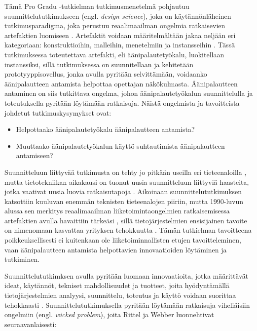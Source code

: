 \documentclass[utf8]{gradu3}
\begin{document}
Tämä Pro Gradu -tutkielman tutkimusmenetelmä pohjautuu suunnittelututkimukseen (engl. \textit{design science}), joka on käytännönläheinen tutkimusparadigma, joka perustuu reaalimaailman ongelmia ratkaisevien artefaktien luomiseen \parencite[][]{hevner2004}. Artefaktit voidaan määritelmältään jakaa neljään eri kategoriaan: konstruktioihin, malleihin, menetelmiin ja instansseihin \parencite[][]{hevner2004}. Tässä tutkimuksessa toteutettava artefakti, eli äänipalautetyökalu, luokitellaan instanssiksi, sillä tutkimuksessa on suunnitellaan ja kehitetään prototyyppisovellus, jonka avulla pyritään selvittämään, voidaanko äänipalautteen antamista helpottaa opettajan näkökulmasta. Äänipalautteen antaminen on siis tutkittava ongelma, johon äänipalautetyökalun suunnittelulla ja toteutuksella pyritään löytämään ratkaisuja. Näistä ongelmista ja tavoitteista johdetut tutkimuskysymykset ovat:

\begin{itemize}
  \item Helpottaako äänipalautetyökalu äänipalautteen antamista?
  \item Muuttaako äänipalautetyökalun käyttö suhtautimista äänipalautteen antamiseen?
\end{itemize}

Suunnitteluun liittyvää tutkimusta on tehty jo pitkään useilla eri tieteenaloilla \parencite[][]{cross2001}, mutta tietotekniikan aikakausi on tuonut uusia suunnitteluun liittyviä haasteita, jotka vaativat uusia luovia ratkaisutapoja \parencite[][]{design}. Aikoinaan suunnittelututkimuksen katsottiin kuuluvan enemmän teknisten tieteenalojen piiriin, mutta 1990-luvun alussa sen merkitys reaalimaailman liiketoimintaongelmien ratkaisemisessa artefaktien avulla havaittiin tärkeäsi \parencite[][]{design}, sillä tietojärjestelmien ensisijainen tavoite on nimenomaan kasvattaa yrityksen tehokkuutta \parencite[][]{hevner2004}. Tämän tutkielman tavoitteena poikkeuksellisesti ei kuitenkaan ole liiketoiminnallisten etujen tavoitteleminen, vaan äänipalautteen antamista helpottavien innovaatioiden löytäminen ja tutkiminen.

Suunnittelututkimksen avulla pyritään luomaan innovaatioita, jotka määrittävät ideat, käytännöt, tekniset mahdollisuudet ja tuotteet, joita hyödyntämällä tietojärjestelmien analyysi, suunnittelu, toteutus ja käyttö voidaan suorittaa tehokkaasti \parencite[][]{hevner2004}. Suunnittelututkimuksella pyritään löytämään ratkaisuja viheliäisiin ongelmiin (engl. \textit{wicked problem}), joita Rittel ja Webber \parencite[][]{wicked} luonnehtivat seuraavanlaisesti: 
\end{document}
